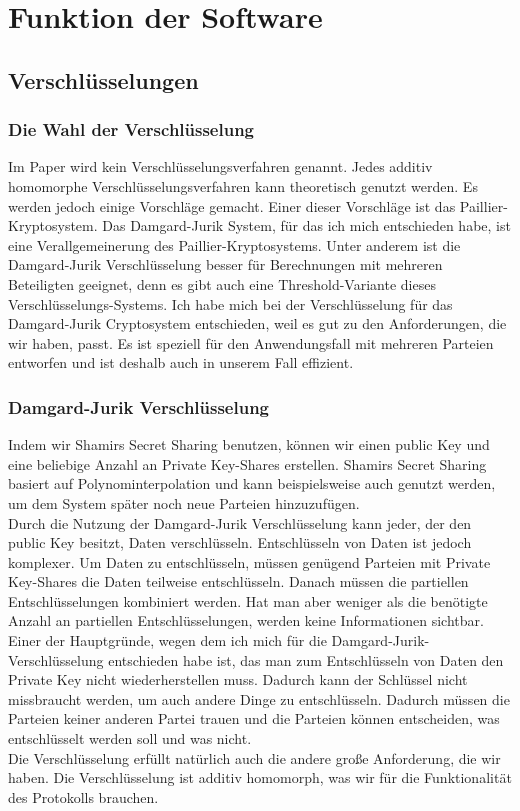 \chapter{Funktion der Software}

\section{Verschlüsselungen}
\subsection{Die Wahl der Verschlüsselung}
Im Paper \cite{Doettling2021} wird kein Verschlüsselungsverfahren genannt. Jedes additiv homomorphe Verschlüsselungsverfahren kann theoretisch genutzt werden. Es werden jedoch einige Vorschläge  gemacht. Einer dieser Vorschläge ist das Paillier-Kryptosystem. Das Damgard-Jurik System, für das ich mich entschieden habe, ist eine Verallgemeinerung des Paillier-Kryptosystems. Unter anderem ist die Damgard-Jurik Verschlüsselung besser für Berechnungen mit mehreren Beteiligten geeignet, denn es gibt auch eine Threshold-Variante dieses Verschlüsselungs-Systems. \cite{IvanDamgard2004}
Ich habe mich bei der Verschlüsselung für das Damgard-Jurik Cryptosystem entschieden, weil es gut zu den Anforderungen, die wir haben, passt. Es ist speziell für den Anwendungsfall mit mehreren Parteien entworfen und ist deshalb auch in unserem Fall effizient.\\



\subsection{Damgard-Jurik Verschlüsselung}
Indem wir Shamirs Secret Sharing benutzen, können wir einen public Key und eine beliebige Anzahl an Private Key-Shares erstellen. Shamirs Secret Sharing basiert auf Polynominterpolation und kann beispielsweise auch genutzt werden, um dem System später noch neue Parteien hinzuzufügen.\cite{Shamir1979}\\
Durch die Nutzung der Damgard-Jurik Verschlüsselung kann jeder, der den public Key besitzt, Daten verschlüsseln. Entschlüsseln von Daten ist jedoch komplexer. Um Daten zu entschlüsseln, müssen genügend Parteien mit Private Key-Shares die Daten teilweise entschlüsseln. Danach müssen die partiellen Entschlüsselungen kombiniert werden. Hat man aber weniger als die benötigte Anzahl an partiellen Entschlüsselungen, werden keine Informationen sichtbar. \cite{IvanDamgard2004}\\
Einer der Hauptgründe, wegen dem ich mich für die Damgard-Jurik-Verschlüsselung entschieden habe ist, das man zum Entschlüsseln von Daten den Private Key nicht wiederherstellen muss. Dadurch kann der Schlüssel nicht missbraucht werden, um auch andere Dinge zu entschlüsseln. Dadurch müssen die Parteien keiner anderen Partei trauen und die Parteien können entscheiden, was entschlüsselt werden soll und was nicht. \cite{IvanDamgard2004}\\
Die Verschlüsselung erfüllt natürlich auch die andere große Anforderung, die wir haben. Die Verschlüsselung ist additiv homomorph, was wir für die Funktionalität des Protokolls brauchen. \cite{IvanDamgard2004}

